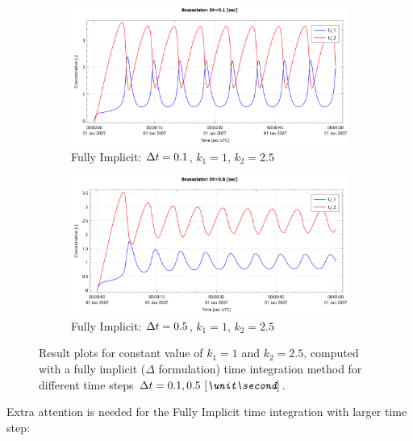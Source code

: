 \begin{figure}[H]
    \begin{subfigure}{0.5\textwidth}
        \includegraphics[width=\textwidth]{figures/brusselator_imp_dt=0d10.pdf}
        \caption{Fully Implicit: $\Delta t=0.1$, $k_1=1$, $k_2=2.5$}
    \end{subfigure}
    \begin{subfigure}{0.5\textwidth}
        \includegraphics[width=\textwidth]{figures/brusselator_imp_dt=0d50.pdf}
        \caption{Fully Implicit: $\Delta t=0.5$, $k_1=1$, $k_2=2.5$}
    \end{subfigure}
    \caption[Brusselator experiment: $\Dt = 0.1, 0.5\ \bunit{\second}$]{Result plots for constant value of $k_1 = 1$ and $k_2 =2.5$, computed with a fully implicit ($\Delta$ formulation) time integration method for different time steps $\Dt = 0.1, 0.5\ \bunit{\second}$.}
\end{figure}
Extra attention is needed for the Fully Implicit time integration with larger time step:
